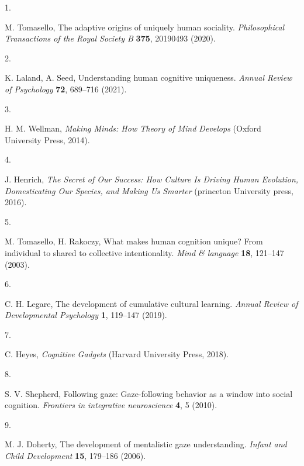 \documentclass[
  man,floatsintext]{apa6}
\newlength{\cslhangindent}
\newlength{\csllabelwidth}
\newlength{\cslentryspacingunit} %
\newenvironment{CSLReferences}[2] %
 {%
  \setlength{\parindent}{0pt}
  \ifodd #1
  \let\oldpar\par
  \def\par{\hangindent=\cslhangindent\oldpar}
  \fi
  \setlength{\parskip}{#2\cslentryspacingunit}
 }%
 {}
\newcommand{\CSLLeftMargin}[1]{\parbox[t]{\csllabelwidth}{#1}}
\newcommand{\CSLRightInline}[1]{\parbox[t]{\linewidth - \csllabelwidth}{#1}\break}
\begin{document}
\hypertarget{refs}{}
\begin{CSLReferences}{0}{0}
\leavevmode{}%
\CSLLeftMargin{1. }%
\CSLRightInline{M. Tomasello, The adaptive origins of uniquely human sociality. \emph{Philosophical Transactions of the Royal Society B} \textbf{375}, 20190493 (2020).}

\leavevmode{}%
\CSLLeftMargin{2. }%
\CSLRightInline{K. Laland, A. Seed, Understanding human cognitive uniqueness. \emph{Annual Review of Psychology} \textbf{72}, 689--716 (2021).}

\leavevmode{}%
\CSLLeftMargin{3. }%
\CSLRightInline{H. M. Wellman, \emph{Making Minds: How Theory of Mind Develops} (Oxford University Press, 2014).}

\leavevmode{}%
\CSLLeftMargin{4. }%
\CSLRightInline{J. Henrich, \emph{The Secret of Our Success: How Culture Is Driving Human Evolution, Domesticating Our Species, and Making Us Smarter} (princeton University press, 2016).}

\leavevmode{}%
\CSLLeftMargin{5. }%
\CSLRightInline{M. Tomasello, H. Rakoczy, What makes human cognition unique? From individual to shared to collective intentionality. \emph{Mind \& language} \textbf{18}, 121--147 (2003).}

\leavevmode{}%
\CSLLeftMargin{6. }%
\CSLRightInline{C. H. Legare, The development of cumulative cultural learning. \emph{Annual Review of Developmental Psychology} \textbf{1}, 119--147 (2019).}

\leavevmode{}%
\CSLLeftMargin{7. }%
\CSLRightInline{C. Heyes, \emph{Cognitive Gadgets} (Harvard University Press, 2018).}

\leavevmode{}%
\CSLLeftMargin{8. }%
\CSLRightInline{S. V. Shepherd, Following gaze: Gaze-following behavior as a window into social cognition. \emph{Frontiers in integrative neuroscience} \textbf{4}, 5 (2010).}

\leavevmode{}%
\CSLLeftMargin{9. }%
\CSLRightInline{M. J. Doherty, The development of mentalistic gaze understanding. \emph{Infant and Child Development} \textbf{15}, 179--186 (2006).}


\end{CSLReferences}
\end{document}
